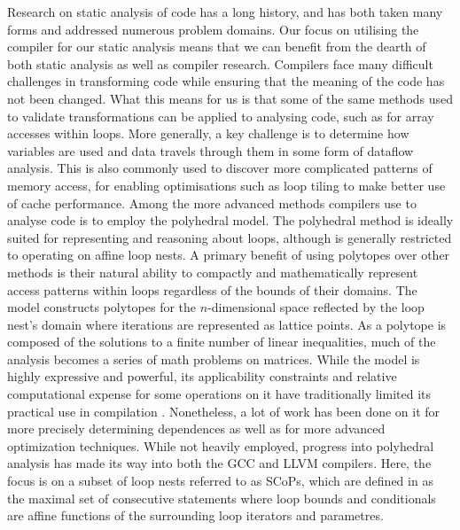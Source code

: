 Research on static analysis of code has a long history, and has both taken many forms and addressed numerous problem domains\cite{Andrade:2012:SAW:2355585.2355593}\cite{1194988}.
Our focus on utilising the compiler for our static analysis means that we can benefit from the dearth of both static analysis as well as compiler research.
Compilers face many difficult challenges in transforming code while ensuring that the meaning of the code has not been changed.
What this means for us is that some of the same methods used to validate transformations can be applied to analysing code, such as for array accesses within loops.
More generally, a key challenge is to determine how variables are used and data travels through them in some form of dataflow analysis\cite{Feautrier1991}.
This is also commonly used to discover more complicated patterns of memory access, for enabling optimisations such as loop tiling to make better use of cache performance.
Among the more advanced methods compilers use to analyse code is to employ the polyhedral model\cite{Cousot:1978:ADL:512760.512770}\cite{Bagnara:2009:APC:1628316.1628385}\cite{benabderrahmane.10.cc}.
The polyhedral method is ideally suited for representing and reasoning about loops, although is generally restricted to operating on affine loop nests.
A primary benefit of using polytopes over other methods is their natural ability to compactly and mathematically represent access patterns within loops regardless of the bounds of their domains.
The model constructs polytopes for the $n$-dimensional space reflected by the loop nest's domain where iterations are represented as lattice points.
As a polytope is composed of the solutions to a finite number of linear inequalities, much of the analysis becomes a series of math problems on matrices.
While the model is highly expressive and powerful, its applicability constraints and relative computational expense for some operations on it have traditionally limited its practical use in compilation \cite{DBLP:journals/entcs/Simon10a}.
Nonetheless, a lot of work has been done on it for more precisely determining dependences \cite{Vasilache:2006:VDA:1183401.1183448} as well as for more advanced optimization techniques\cite{Nieuwenhuizen2014AutovectorizationUP}\cite{5260526}.
While not heavily employed, progress into polyhedral analysis has made its way into both the \ac{GCC}\cite{trifunovic:inria-00551516} and LLVM\cite{grosser.11.impact} compilers.
Here, the focus is on a subset of loop nests referred to as \acp{SCoP}\cite{TBas}, which are defined in \cite{benabderrahmane.10.cc} as the maximal set of consecutive statements where loop bounds and conditionals are affine functions of the surrounding loop iterators and parametres.

